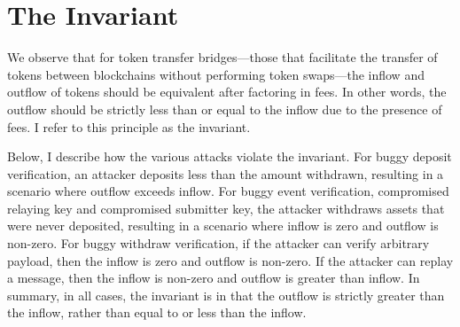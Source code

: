 \section{The Invariant}
We observe that for token transfer bridges—those that facilitate the transfer of tokens between blockchains without performing token swaps—the inflow and outflow of tokens should be equivalent after factoring in fees. In other words, the outflow should be strictly less than or equal to the inflow due to the presence of fees. I refer to this principle as the invariant.


Below, I describe how the various attacks violate the invariant. For buggy deposit verification, an attacker deposits less than the amount withdrawn, resulting in a scenario where outflow exceeds inflow. For buggy event verification, compromised relaying key and compromised submitter key, the attacker withdraws assets that were never deposited, resulting in a scenario where inflow is zero and outflow is non-zero. For buggy withdraw verification, if the attacker can verify arbitrary payload, then the inflow is zero and outflow is non-zero. If the attacker can replay a message, then the inflow is non-zero and outflow is greater than inflow. In summary, in all cases, the invariant is in that the outflow is strictly greater than the inflow, rather than equal to or less than the inflow.


